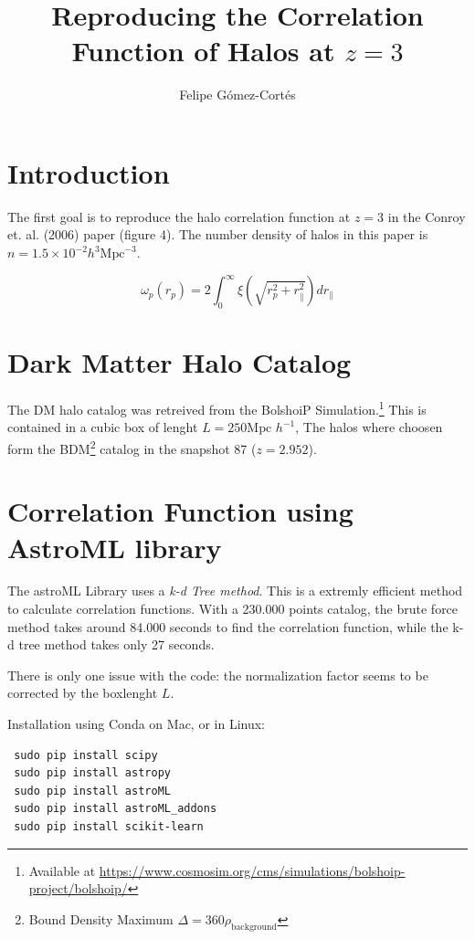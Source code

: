 \documentclass{article}
\title{Reproducing the Correlation Function of Halos at $z=3$}
\author{Felipe G\'omez-Cort\'es}
\begin{document}
 
 \maketitle 
 
 
 \section{Introduction}
 The first goal is to reproduce the halo correlation function at $z=3$ in the 
 Conroy et. al. (2006)\cite{Conroy06} paper (figure 4). The number density of halos
 in this paper is $n=1.5\times10^{-2}h^3 \textrm{Mpc}^{-3}$.

  \begin{equation}
  \omega_p(r_p) = 2 \int_0^\infty \xi \left( \sqrt{r_p^2 + r_\parallel^2} \right) dr_\parallel
 \end{equation}

 
 \section{Dark Matter Halo Catalog}
 
 The DM halo catalog was retreived from the BolshoiP Simulation.\footnote{Available at 
 \url{https://www.cosmosim.org/cms/simulations/bolshoip-project/bolshoip/}}
 This is contained in a cubic box of lenght $L = 250 \textrm{Mpc }h^{-1}$,  
 The halos where choosen form the BDM\footnote{Bound Density
 Maximum $\Delta = 360\rho_\textrm{background}$} catalog in the snapshot 87 ($z=2.952$).
 
   
 \section{Correlation Function using AstroML library}
 The astroML Library uses a \textit{k-d Tree method}. This is a extremly efficient method
 to calculate correlation functions.  With a 230.000 points catalog, the brute force 
 method takes around 84.000 seconds to  find the correlation function, while the k-d 
 tree method takes only 27 seconds.
 
 There is only one issue with the code: the normalization factor seems to be corrected
 by the boxlenght $L$.
 
 Installation using Conda on Mac, or in Linux:
 \begin{verbatim}
 sudo pip install scipy
 sudo pip install astropy
 sudo pip install astroML
 sudo pip install astroML_addons
 sudo pip install scikit-learn
 \end{verbatim}
 
\end{document}
